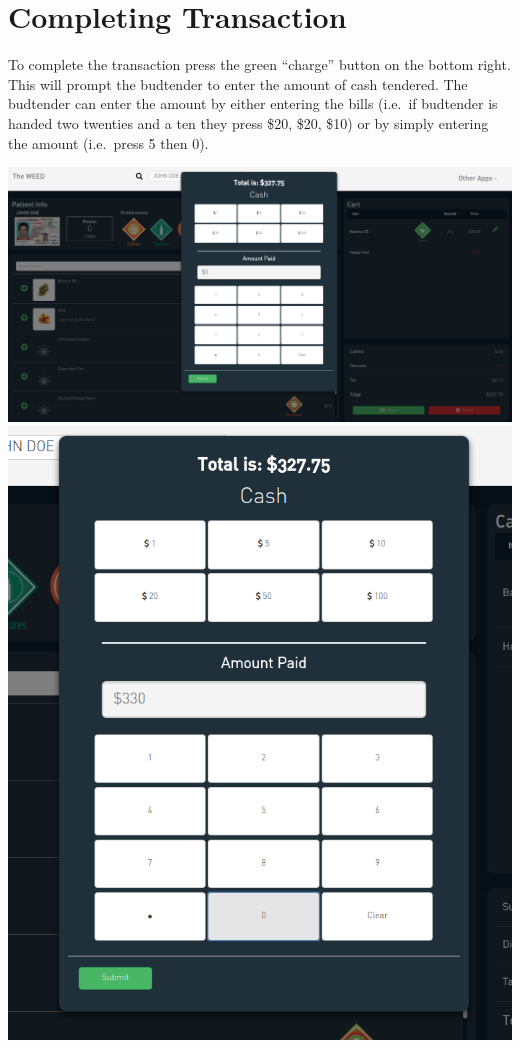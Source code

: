 \documentclass[]{book}
\theoremstyle{definition}
\theoremstyle{definition}
\theoremstyle{definition}
\theoremstyle{remark}
\begin{document}
\section{Completing Transaction}\label{completing-transaction}

To complete the transaction press the green ``charge'' button on the
bottom right. This will prompt the budtender to enter the amount of cash
tendered. The budtender can enter the amount by either entering the
bills (i.e.~if budtender is handed two twenties and a ten they press
\$20, \$20, \$10) or by simply entering the amount (i.e.~press 5 then
0).

\includegraphics{images/P9.png} \includegraphics{images/P10.png}
\end{document}
